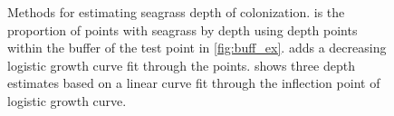 \documentclass[letterpaper,12pt,oneside]{article}\usepackage[]{graphicx}\usepackage[]{color}
\begin{document}
\begin{figure}
\centering
{}


\caption{Methods for estimating seagrass depth of colonization.  is the proportion of points with seagrass by depth using depth points within the buffer of the test point in \cref{fig:buff_ex}.   adds a decreasing logistic growth curve fit through the points.   shows three depth estimates based on a linear curve fit through the inflection point of logistic growth curve.}
\label{fig:est_ex}
\end{figure}
\end{document}
